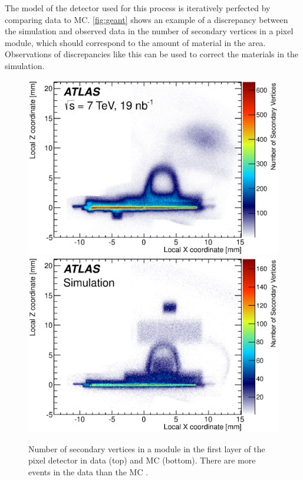 The model of the detector used for this process is iteratively perfected by comparing data to \ac{MC}. \autoref{fig:geant} shows an example of a discrepancy between the simulation and observed data in the number of secondary vertices in a pixel module, which should correspond to the amount of material in the area. Observations of discrepancies like this can be used to correct the materials in the simulation. 

\begin{centering}
\begin{figure}[!hbt]
\myfloatalign
\includegraphics[width=.9\linewidth]{figures/theory/fig_10a.eps}
\includegraphics[width=.9\linewidth]{figures/theory/fig_10b.eps}
\caption{Number of secondary vertices in a module in the first layer of the pixel detector in data (top) and \ac{MC} (bottom). There are more events in the data than the \ac{MC} \cite{PERF-2015-06}.}
\label{fig:geant}
\end{figure}
\end{centering}

